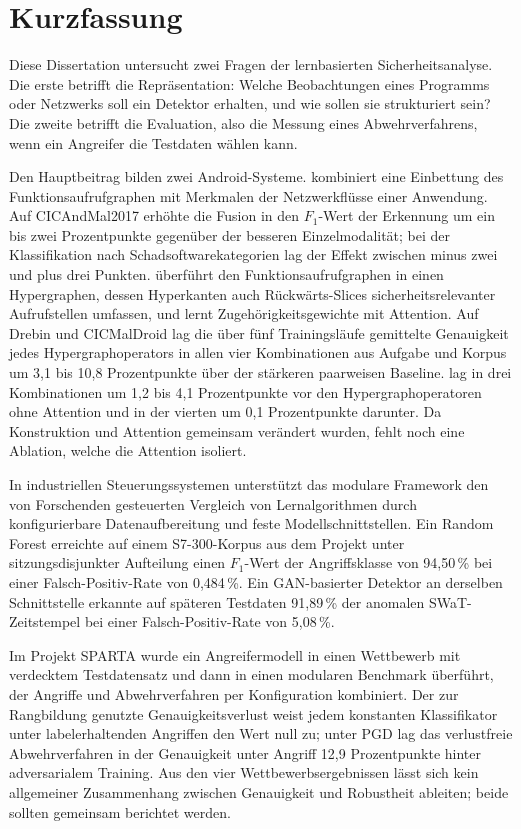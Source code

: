 \cleardoublepage
{}
\chapter*{Kurzfassung}

Diese Dissertation untersucht zwei Fragen der lernbasierten Sicherheitsanalyse. Die erste
betrifft die Repräsentation: Welche Beobachtungen eines Programms oder Netzwerks soll ein
Detektor erhalten, und wie sollen sie strukturiert sein? Die zweite betrifft die Evaluation, also
die Messung eines Abwehrverfahrens, wenn ein Angreifer die Testdaten wählen kann.

Den Hauptbeitrag bilden zwei Android-Systeme. \hybroid{} kombiniert eine Einbettung des
Funktionsaufrufgraphen mit \netfeatures{} Merkmalen der Netzwerkflüsse einer Anwendung. Auf
CICAndMal2017 erhöhte die Fusion in \hybroid{} den $F_1$-Wert der Erkennung um ein bis zwei Prozentpunkte
gegenüber der besseren Einzelmodalität; bei der Klassifikation nach Schadsoftwarekategorien lag
der Effekt zwischen minus zwei und plus drei Punkten. \hgann{} überführt den
Funktionsaufrufgraphen in einen Hypergraphen, dessen Hyperkanten auch Rückwärts-Slices
sicherheitsrelevanter Aufrufstellen umfassen, und lernt Zugehörigkeitsgewichte mit Attention.
Auf Drebin und CICMalDroid lag die über fünf Trainingsläufe gemittelte Genauigkeit jedes
Hypergraphoperators in allen vier Kombinationen aus Aufgabe und Korpus um 3,1 bis 10,8
Prozentpunkte über der stärkeren paarweisen Baseline.
\hgann{} lag in drei Kombinationen um 1,2 bis 4,1 Prozentpunkte vor den Hypergraphoperatoren
ohne Attention und in der vierten um 0,1 Prozentpunkte darunter. Da Konstruktion und Attention gemeinsam verändert wurden, fehlt noch eine Ablation,
welche die Attention isoliert.

In industriellen Steuerungssystemen unterstützt das modulare Framework \nadics{} den von
Forschenden gesteuerten Vergleich von Lernalgorithmen durch konfigurierbare Datenaufbereitung
und feste Modellschnittstellen. Ein Random Forest
erreichte auf einem S7-300-Korpus aus dem Projekt \iuno{} unter sitzungsdisjunkter Aufteilung
einen $F_1$-Wert der Angriffsklasse von 94,50\,\% bei einer Falsch-Positiv-Rate von 0,484\,\%.
Ein GAN-basierter Detektor an derselben Schnittstelle erkannte auf späteren Testdaten
91,89\,\% der anomalen SWaT-Zeitstempel bei einer Falsch-Positiv-Rate von 5,08\,\%.

Im Projekt SPARTA wurde ein Angreifermodell in einen Wettbewerb mit verdecktem Testdatensatz und
dann in einen modularen Benchmark überführt, der Angriffe und Abwehrverfahren per Konfiguration
kombiniert. Der zur Rangbildung genutzte Genauigkeitsverlust weist jedem konstanten
Klassifikator unter labelerhaltenden Angriffen den Wert null zu; unter PGD lag das verlustfreie
Abwehrverfahren in der Genauigkeit unter Angriff 12,9 Prozentpunkte hinter adversarialem
Training. Aus den vier Wettbewerbsergebnissen lässt sich kein allgemeiner Zusammenhang zwischen
Genauigkeit und Robustheit ableiten; beide sollten gemeinsam berichtet werden.

